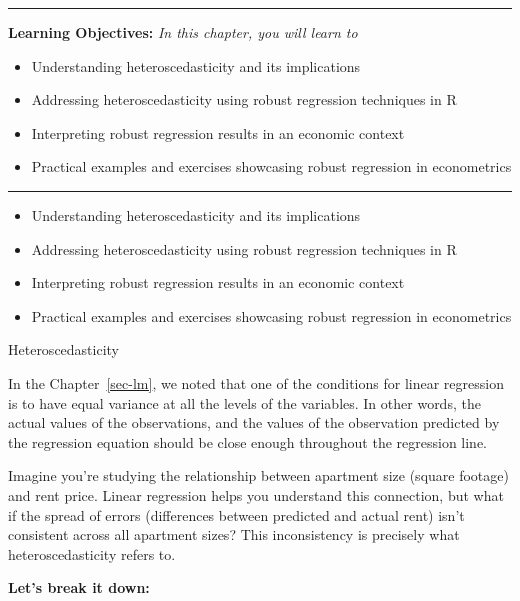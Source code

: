 \documentclass[
  letterpaper,
  paper =a4,
  twoside,
  openright,
  headsepline,
  footsepline,
  listof = totocnumbered,
  chapterprefix = true,
  firstiscover,
  parskip = full*]{scrbook}
\providecommand{\abstractname}{Learning Objectives} %
\newenvironment{objectives}[1]{%
	\hrule
	\vspace{5pt}
	\small\textbf{\abstractname: } 
	\newline
	\vspace{0.1cm}
	\small\emph{#1} %
	\itshape %
}{%
	\vspace{5pt}
	\hrule
	\vspace{0.6cm}
}
\begin{document}
\begin{objectives}{In this chapter, you will learn to}
\begin{itemize}

\item{Understanding heteroscedasticity and its implications}

\item{Addressing heteroscedasticity using robust regression techniques in R}

\item{Interpreting robust regression results in an economic context}

\item{Practical examples and exercises showcasing robust regression in econometrics}

\end{itemize}

\end{objectives}

\begin{itemize}
\item
  Understanding heteroscedasticity and its implications
\item
  Addressing heteroscedasticity using robust regression techniques in R
\item
  Interpreting robust regression results in an economic context
\item
  Practical examples and exercises showcasing robust regression in
  econometrics
\end{itemize}

Heteroscedasticity

In the Chapter~\ref{sec-lm}, we noted that one of the conditions for
linear regression is to have equal variance at all the levels of the
variables. In other words, the actual values of the observations, and
the values of the observation predicted by the regression equation
should be close enough throughout the regression line.

Imagine you're studying the relationship between apartment size (square
footage) and rent price. Linear regression helps you understand this
connection, but what if the spread of errors (differences between
predicted and actual rent) isn't consistent across all apartment sizes?
This inconsistency is precisely what heteroscedasticity refers to.

\textbf{Let's break it down:}
\end{document}
